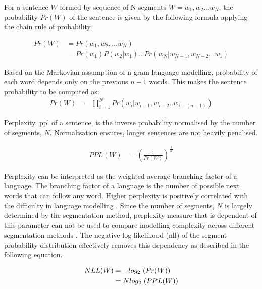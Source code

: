 
For a sentence $W$ formed by sequence of N segments $W = w_1,w_2 . . . w_N$,
the probability $Pr(W)$ of the sentence is given by the following formula
applying the chain rule of probability.

\begin{align}
    Pr(W) & = Pr(w_1,w_2,... w_N)                              \\
         & = Pr(w_1)P(w_2|w_1)...Pr(w_N|w_{N-1},w_{N-2}...w_1)
\end{align}

Based on the Markovian assumption of n-gram language modelling, probability of
each word depends only on the previous $n-1$ words. This makes the sentence
probability to be computed as:
\begin{align}
    Pr(W) & = \prod_{i = 1}^{N} Pr(w_i |w_{i-1},w_{i-2}..w_{i-(n-1)})
\end{align}

Perplexity, \gls{ppl} of a sentence, is the inverse probability normalised by the
number of segments, $N$. Normalisation ensures, longer sentences are not heavily
penalised.

\begin{align}
    PPL(W) & = { \left( \frac{1}{Pr(W)} \right)}^{\frac{1}{N}}
\end{align}

Perplexity can be interpreted as the weighted average branching factor of a
language. The branching factor of a language is the number of possible next
words that can follow any word. Higher perplexity is positively correlated with
the difficulty in language modelling \cite{jurafsky2009}. Since the number of
segments, $N$ is largely determined by the segmentation method, perplexity
measure that is dependent of this parameter can not be used to compare
modelling complexity across different segmentation methods
\cite{mielke-etal-2019-kind}. The negative log likelihood (\gls{nll}) of the segment
probability distribution effectively removes this dependency as described in
the following equation.

\begin{align}
    \vspace{-0.4cm}
    NLL(W) & = - log_2\ (Pr(W))   \\
           & = N log_2\ (PPL(W))
\end{align}

